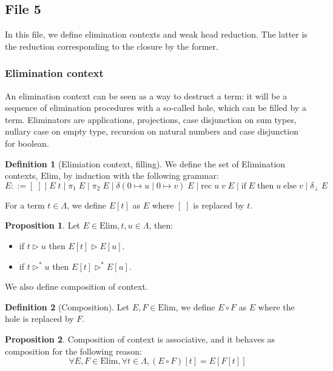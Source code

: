 \documentclass{article}
\newcommand{\ife}[3]{\mathrm{if}\;#1\;\mathrm{then}\;#2\;\mathrm{else}\;#3}
\newcommand{\rec}[0]{\mathrm{rec}}
\newcommand{\deltacase}[3]{\delta(0\mapsto #1\mid 0 \mapsto #2)\;#3}
\newcommand{\Elim}[0]{\mathrm{Elim}}
\theoremstyle{definition}
\newtheorem{defi}{Definition}
\newtheorem{prop}{Proposition}[subsection]
\begin{document}
\subsection{File 5}

In this file, we define elimination contexts and weak head reduction. The latter is the reduction
corresponding to the closure by the former.

\subsubsection{Elimination context}

An elimination context can be seen as a way to destruct a term: it will be a sequence of elimination
procedures with a so-called hole, which can be filled by a term. Eliminators are applications, projections,
case disjunction on sum types, nullary case on empty type, recursion on natural numbers and case disjunction
for boolean.

\begin{defi}[Elimiation context, filling]
    We define the set of Elimination contexts, $\Elim$, by induction with the following grammar:
    $$E ::= [\;]\mid E\;t\mid \pi_1\;E\mid \pi_2\;E\mid \deltacase{u}{v}{E}\mid \rec\;u\;v\;E\mid
    \ife{E}{u}{v}\mid \delta_\bot\;E$$

    For a term $t\in\Lambda$, we define $E[t]$ as $E$ where $[\;]$ is replaced by $t$.
\end{defi}

\begin{prop}
    Let $E\in\Elim, t,u\in\Lambda$, then:
    \begin{itemize}
        \item if $t\rhd u$ then $E[t]\rhd E[u]$.
        \item if $t \rhd^* u$ then $E[t]\rhd^* E[u]$.
    \end{itemize}
\end{prop}

We also define composition of context.

\begin{defi}[Composition]
    Let $E,F\in\Elim$, we define $E\circ F$ as $E$ where the hole is replaced by $F$.
\end{defi}

\begin{prop}
    Composition of context is associative, and it behaves as composition for the following reason:
    $$\forall E,F\in\Elim, \forall t \in \Lambda, (E\circ F)[t] = E[F[t]]$$
\end{prop}
\end{document}
